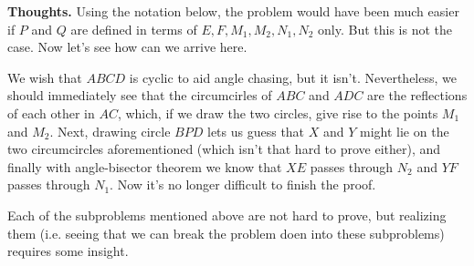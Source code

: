\documentclass[11pt,a4paper]{article}
\begin{document}
\begin{itemize}
\textbf{Thoughts.} Using the notation below, the problem would have been much easier if $P$ and $Q$ are defined in terms of $E, F, M_1, M_2, N_1, N_2$ only. But this is not the case. Now let's see how can we arrive here. 

We wish that $ABCD$ is cyclic to aid angle chasing, but it isn't. Nevertheless, we should immediately see that the circumcirles of $ABC$ and $ADC$ are the reflections of each other in $AC$, which, if we draw the two circles, give rise to the points $M_1$ and $M_2$. Next, drawing circle $BPD$ lets us guess that $X$ and $Y$ might lie on the two circumcircles aforementioned (which isn't that hard to prove either), and finally with angle-bisector theorem we know that $XE$ passes through $N_2$ and $YF$ passes through $N_1$. Now it's no longer difficult to finish the proof. 

Each of the subproblems mentioned above are not hard to prove, but realizing them (i.e. seeing that we can break the problem doen into these subproblems) requires some insight.


\end{itemize}
\end{document}
